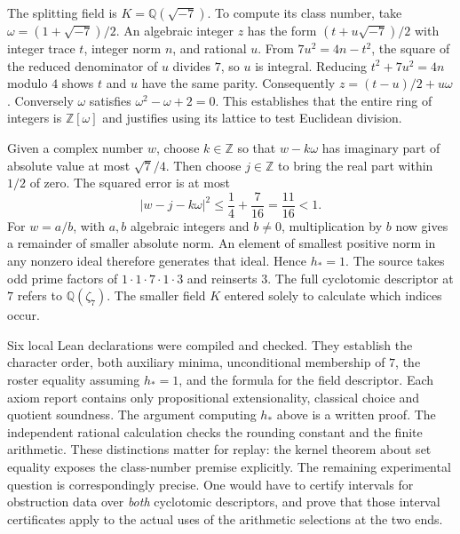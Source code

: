 \documentclass[12pt,letterpaper]{article}
\begin{document}
The splitting field is $K=\mathbb{Q}(\sqrt{-7})$. To compute its class number, take $\omega=(1+\sqrt{-7})/2$. An algebraic integer $z$ has the form $(t+u\sqrt{-7})/2$ with integer trace $t$, integer norm $n$, and rational $u$. From $7u^2=4n-t^2$, the square of the reduced denominator of $u$ divides $7$, so $u$ is integral. Reducing $t^2+7u^2=4n$ modulo $4$ shows $t$ and $u$ have the same parity. Consequently $z=(t-u)/2+u\omega$. Conversely $\omega$ satisfies $\omega^2-\omega+2=0$. This establishes that the entire ring of integers is $\mathbb Z[\omega]$ and justifies using its lattice to test Euclidean division.

Given a complex number $w$, choose $k\in\mathbb Z$ so that $w-k\omega$ has imaginary part of absolute value at most $\sqrt{7}/4$. Then choose $j\in\mathbb Z$ to bring the real part within $1/2$ of zero. The squared error is at most
\[
 |w-j-k\omega|^2\leq\frac14+\frac7{16}=\frac{11}{16}<1.
\]
For $w=a/b$, with $a,b$ algebraic integers and $b\ne0$, multiplication by $b$ now gives a remainder of smaller absolute norm. An element of smallest positive norm in any nonzero ideal therefore generates that ideal. Hence $h_*=1$. The source takes odd prime factors of $1\cdot1\cdot7\cdot1\cdot3$ and reinserts $3$. The full cyclotomic descriptor at $7$ refers to $\mathbb Q(\zeta_7)$. The smaller field $K$ entered solely to calculate which indices occur.

Six local Lean declarations were compiled and checked. They establish the character order, both auxiliary minima, unconditional membership of $7$, the roster equality assuming $h_*=1$, and the formula for the field descriptor. Each axiom report contains only propositional extensionality, classical choice and quotient soundness. The argument computing $h_*$ above is a written proof. The independent rational calculation checks the rounding constant and the finite arithmetic. These distinctions matter for replay: the kernel theorem about set equality exposes the class-number premise explicitly. The remaining experimental question is correspondingly precise. One would have to certify intervals for obstruction data over \emph{both} cyclotomic descriptors, and prove that those interval certificates apply to the actual uses of the arithmetic selections at the two ends.
\end{document}

